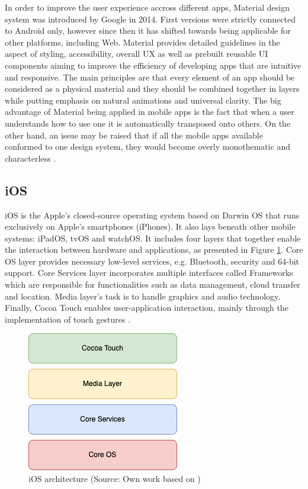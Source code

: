 In order to improve the user experience accross different apps, Material design system was introduced by Google in 2014. First versions were strictly connected to Android only, however since then it has shifted towards being applicable for other platforms, including Web. Material provides detailed guidelines in the aspect of styling, accessibility, overall UX as well as prebuilt reusable UI components aiming to improve the efficiency of developing apps that are intuitive and responsive. The main principles are that every element of an app should be considered as a physical material and they should be combined together in layers while putting emphasis on natural animations and universal clarity. The big advantage of Material being applied in mobile apps is the fact that when a user understands how to use one it is automatically transposed onto others. On the other hand, an issue may be raised that if all the mobile apps available conformed to one design system, they would become overly monothematic and characterless \cite{material_design_get_started,material_design_pros_cons}.

\subsection{iOS}\label{chap:ios}

iOS is the Apple's closed-source operating system based on Darwin OS that runs exclusively on Apple's smartphones (iPhones). It also lays beneath other mobile systems: iPadOS, tvOS and watchOS. It includes four layers that together enable the interaction between hardware and applications, as presented in Figure \ref{fig:ios_architecture}. Core OS layer provides necessary low-level services, e.g. Bluetooth, security and 64-bit support. Core Services layer incorporates multiple interfaces called Frameworks which are responsible for functionalities such as data management, cloud transfer and location. Media layer's task is to handle graphics and audio technology. Finally, Cocoa Touch enables user-application interaction, mainly through the implementation of touch gestures \cite{ios_architecture,mobile_os_survey}.

\begin{figure}[h]
  \centering
  \includegraphics[scale=0.65]{img/ios_architecture}
  \caption{iOS architecture (Source: Own work based on \cite{ios_architecture})}
  \label{fig:ios_architecture}
\end{figure}

